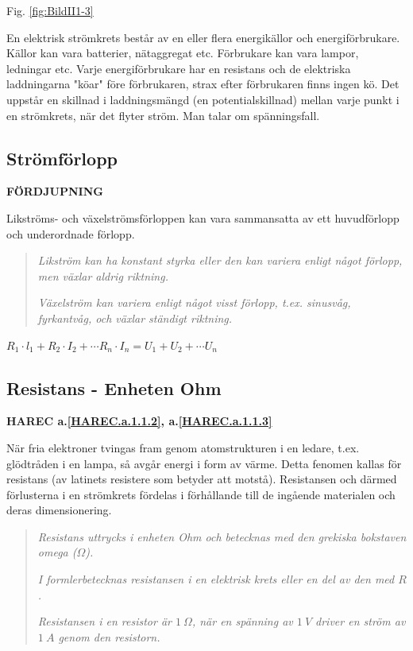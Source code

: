 Fig. \ref{fig:BildII1-3}

En elektrisk strömkrets består av en eller flera energikällor och
energiförbrukare. Källor kan vara batterier, nätaggregat etc. Förbrukare kan
vara lampor, ledningar etc. Varje energiförbrukare har en resistans
och de elektriska laddningarna "köar" före förbrukaren, strax efter förbrukaren
finns ingen kö. Det uppstår en skillnad i laddningsmängd (en potentialskillnad)
mellan varje punkt i en strömkrets, när det flyter ström. Man talar om
spänningsfall.

\subsection{Strömförlopp}
\textbf{FÖRDJUPNING}

Likströms- och växelströmsförloppen kan vara sammansatta av ett huvudförlopp och
underordnade förlopp.

\begin{quote}
\emph{Likström kan ha konstant styrka eller den kan variera enligt något
förlopp, men växlar aldrig riktning.}

\emph{Växelström kan variera enligt något visst förlopp, t.ex. sinusvåg,
fyrkantvåg, och växlar ständigt riktning.}
\end{quote}

\(R_1 \cdot l_1 + R_2 \cdot I_2 + \cdots R_n \cdot I_n = U_1 + U_2 + \cdots U_n\)

\subsection{Resistans - Enheten Ohm}
\textbf{HAREC a.\ref{HAREC.a.1.1.2}\label{myHAREC.a.1.1.2c}, a.\ref{HAREC.a.1.1.3}\label{myHAREC.a.1.1.3c}}

När fria elektroner tvingas fram genom atomstrukturen i en ledare, t.ex.
glödtråden i en lampa, så avgår energi i form av värme.
Detta fenomen kallas för resistans (av latinets resistere som betyder att
motstå). Resistansen och därmed förlusterna i en strömkrets fördelas i
förhållande till de ingående materialen och deras dimensionering.

\begin{quote}
\emph{Resistans uttrycks i enheten Ohm och betecknas med den grekiska bokstaven
omega (\(\Omega\)).}

\emph{I formlerbetecknas resistansen i en elektrisk krets eller en del av den med \(R\).}

\emph{Resistansen i en resistor är \(1\ \Omega\), när en spänning av \(1\ V\)
driver en ström av \(1\ A\) genom den resistorn.}
\end{quote}

